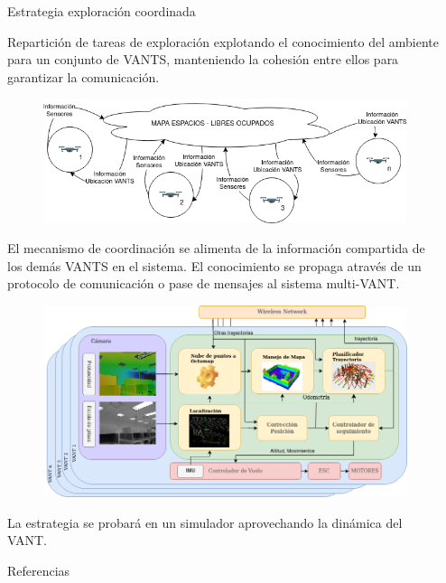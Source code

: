 \documentclass[final]{beamer}
\newlength{\sepwidth}
\newlength{\colwidth}
\newcommand{\separatorcolumn}{\begin{column}{\sepwidth}\end{column}}
\begin{document}
\begin{frame}[t]
\begin{columns}[t]
\begin{column}{\colwidth}
  \begin{block}{\color{teal}Estrategia exploración coordinada}

    Repartición de tareas de exploración explotando el conocimiento del ambiente para un conjunto de VANTS, manteniendo la cohesión entre ellos para garantizar la comunicación.
    \begin{figure}
      \centering
      \includegraphics[width=32cm]{images/problema.png}
    \end{figure}
    El mecanismo de coordinación se alimenta de la información compartida de los demás VANTS en el sistema. El conocimiento se propaga através de un protocolo de comunicación o pase de mensajes al sistema multi-VANT.
    \begin{figure}
      \centering
      \includegraphics[width=32cm]{images/arquitectura.png}
    \end{figure}
  \end{block}
  La estrategia se probará en un simulador aprovechando la dinámica del VANT. \vspace{1cm}
  \begin{block}{\small{\color{teal}Referencias}}
    \begin{multicols}{2}
    \nocite{*}
    \tiny{}
    \end{multicols}
  \end{block}

\end{column}

\separatorcolumn
\end{columns}
\end{frame}
\end{document}
